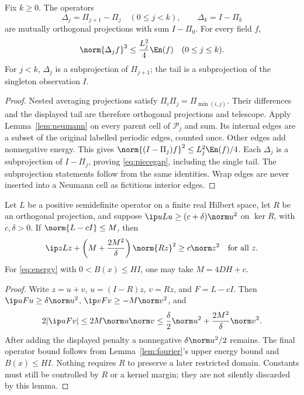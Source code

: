 \begin{lemma}\label{lem:pieces}
Fix $k\geq0$. The operators
\[
 \Delta_j=\Pi_{j+1}-\Pi_j\quad(0\leq j<k),\qquad
 \Delta_k=I-\Pi_k
\]
are mutually orthogonal projections with sum $I-\Pi_0$. For every field $f$,
\begin{equation}\label{eq:piecegap}
 \norm{\Delta_jf}^2\leq\frac{L_j^2}{4}\En(f)
 \quad(0\leq j\leq k).
\end{equation}
For $j<k$, $\Delta_j$ is a subprojection of $\Pi_{j+1}$; the tail is a
subprojection of the singleton observation $I$.
\end{lemma}
\begin{proof}
Nested averaging projections satisfy $\Pi_i\Pi_j=\Pi_{\min(i,j)}$.
Their differences and the displayed tail are therefore orthogonal projections
and telescope. Apply Lemma~\ref{lem:neumann} on every parent cell of
$\mathcal P_j$ and sum. Its internal edges are a subset of the original
labelled periodic edges, counted once. Other edges add nonnegative energy.
This gives $\norm{(I-\Pi_j)f}^2\leq L_j^2\En(f)/4$.
Each $\Delta_j$ is a subprojection of $I-\Pi_j$, proving
\eqref{eq:piecegap}, including the single tail. The subprojection statements
follow from the same identities. Wrap edges are never inserted into a
Neumann cell as fictitious interior edges.
\end{proof}

\begin{lemma}\label{lem:completion}
Let $L$ be a positive semidefinite operator on a finite real Hilbert space,
let $R$ be an orthogonal projection, and suppose
$\ip u{Lu}\geq(c+\delta)\norm u^2$ on $\ker R$, with $c,\delta>0$.
If $\norm{L-cI}\leq M$, then
\begin{equation}\label{eq:completion}
 \ip z{Lz}+\left(M+\frac{2M^2}{\delta}\right)\norm{Rz}^2
 \geq c\norm z^2\quad\text{for all }z.
\end{equation}
For \eqref{eq:energy} with $0<B(x)\leq HI$, one may take $M=4DH+c$.
\end{lemma}
\begin{proof}
Write $z=u+v$, $u=(I-R)z$, $v=Rz$, and $F=L-cI$.
Then $\ip u{Fu}\geq\delta\norm u^2$, $\ip v{Fv}\geq-M\norm v^2$, and
\[
 2|\ip u{Fv}|\leq2M\norm u\norm v
 \leq\frac\delta2\norm u^2+\frac{2M^2}\delta\norm v^2.
\]
After adding the displayed penalty a nonnegative $\delta\norm u^2/2$ remains.
The final operator bound follows from Lemma~\ref{lem:fourier}'s upper energy
bound and $B(x)\leq HI$. Nothing requires $R$ to preserve a later restricted
domain. Constants must still be controlled by $R$ or a kernel margin; they
are not silently discarded by this lemma.
\end{proof}

